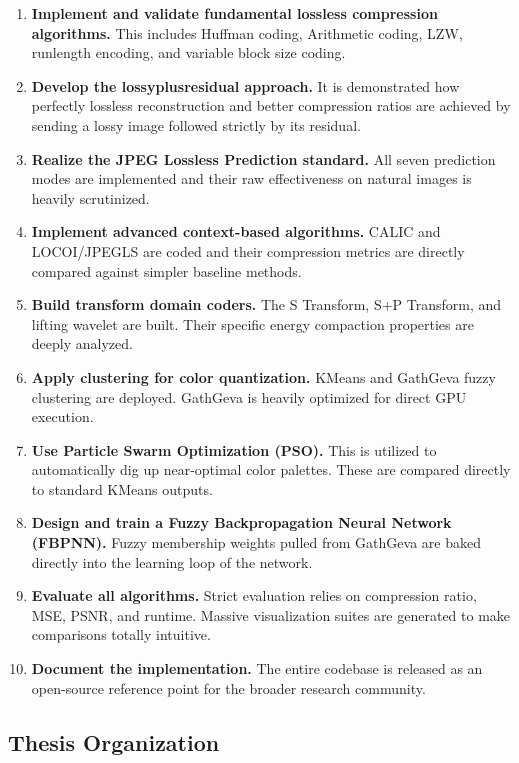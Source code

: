 \begin{enumerate}
    \item \textbf{Implement and validate fundamental lossless compression algorithms.} This includes Huffman coding, Arithmetic coding, LZW, runlength encoding, and variable block size coding.
    \item \textbf{Develop the lossyplusresidual approach.} It is demonstrated how perfectly lossless reconstruction and better compression ratios are achieved by sending a lossy image followed strictly by its residual.
    \item \textbf{Realize the JPEG Lossless Prediction standard.} All seven prediction modes are implemented and their raw effectiveness on natural images is heavily scrutinized.
    \item \textbf{Implement advanced context-based algorithms.} CALIC and LOCOI/JPEGLS are coded and their compression metrics are directly compared against simpler baseline methods.
    \item \textbf{Build transform domain coders.} The S Transform, S+P Transform, and lifting wavelet are built. Their specific energy compaction properties are deeply analyzed.
    \item \textbf{Apply clustering for color quantization.} KMeans and GathGeva fuzzy clustering are deployed. GathGeva is heavily optimized for direct GPU execution.
    \item \textbf{Use Particle Swarm Optimization (PSO).} This is utilized to automatically dig up near-optimal color palettes. These are compared directly to standard KMeans outputs.
    \item \textbf{Design and train a Fuzzy Backpropagation Neural Network (FBPNN).} Fuzzy membership weights pulled from GathGeva are baked directly into the learning loop of the network.
    \item \textbf{Evaluate all algorithms.} Strict evaluation relies on compression ratio, MSE, PSNR, and runtime. Massive visualization suites are generated to make comparisons totally intuitive.
    \item \textbf{Document the implementation.} The entire codebase is released as an open-source reference point for the broader research community.
\end{enumerate}

\subsection{Thesis Organization}

